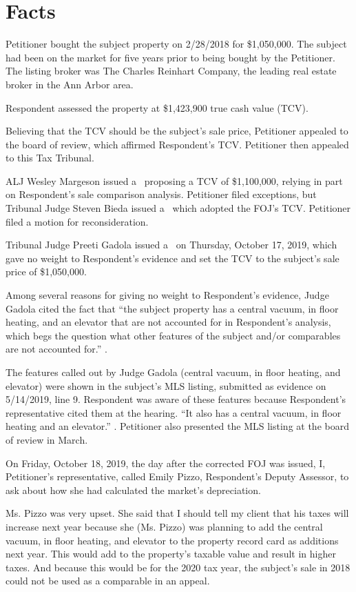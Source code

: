\documentclass[12pt,\documentclassflag]{michiganCourtOfAppealsBrief}
\begin{document}
  
\section{Facts}

Petitioner bought the subject property on 2/28/2018 for \$1,050,000.
The subject had been on the market for five years prior to being bought by the Petitioner. The listing broker was The Charles Reinhart Company, the leading real estate broker in the Ann Arbor area. 

Respondent assessed the property at \$1,423,900 true cash value (TCV).

Believing that the TCV should be the subject's sale price, Petitioner appealed to the board of review, which affirmed Respondent's TCV. Petitioner then appealed to this Tax Tribunal.

ALJ Wesley Margeson issued a \cite{POJ}\ proposing a TCV of \$1,100,000, relying in part on Respondent's sale comparison analysis.
Petitioner filed exceptions, but Tribunal Judge Steven Bieda issued a \cite{FOJ1}\ which adopted the FOJ's TCV.
Petitioner filed a motion for reconsideration.

Tribunal Judge Preeti Gadola issued a \cite{FOJ2}\ on Thursday, October 17, 2019, which gave no weight to Respondent's evidence and set the TCV to the subject's sale price of \$1,050,000.

Among several reasons for giving no weight to Respondent's evidence, Judge Gadola cited the fact that ``the subject property has a central vacuum, in floor heating, and an elevator that are not accounted for in Respondent's analysis, which begs the question what other features of the subject and/or comparables are not accounted for.'' .

The features called out by Judge Gadola (central vacuum, in floor heating, and elevator) were shown in the subject's MLS listing, submitted as evidence on 5/14/2019, line 9. Respondent was aware of these features because Respondent's representative cited them at the hearing. ``It also has a central vacuum, in floor heating and an elevator.'' . Petitioner also presented the MLS listing at the board of review in March.

On Friday, October 18, 2019, the day after the corrected FOJ was issued, I, Petitioner's representative, called Emily Pizzo, Respondent's Deputy Assessor, to ask about how she had calculated the market's depreciation.

Ms. Pizzo was very upset. She said that I should tell my client that his taxes will increase next year because she (Ms. Pizzo) was planning to add the central vacuum, in floor heating, and elevator to the property record card as additions next year. This would add to the property's taxable value and result in higher taxes. And because this would be for the 2020 tax year, the subject's sale in 2018 could not be used as a comparable in an appeal. 
\end{document}
